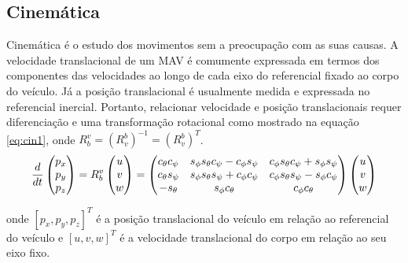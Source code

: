 \documentclass[a4paper, 12pt]{article}
\begin{document}
\subsection{Cinemática}

Cinemática é o estudo dos movimentos sem a preocupação com as suas causas. A velocidade translacional de um MAV é comumente expressada em termos dos componentes das velocidades ao longo de cada eixo do referencial fixado ao corpo do veículo. Já a posição translacional é usualmente medida e expressada no referencial inercial. Portanto, relacionar velocidade e posição translacionais requer diferenciação e uma transformação rotacional como mostrado na equação \ref{eq:cin1}, onde 
${ R }_{ b }^{ v } = {({ R }_{ v }^{ b })}^{-1} = {({ R }_{ v }^{ b })}^T$.
\begin{equation}
\centering
\frac { d }{ dt } 
\begin{pmatrix} 
	{ p }_{ x } \\ { p }_{ y } \\ { p }_{ z } 
\end{pmatrix} = 
{ R }_{ b }^{ v }
\begin{pmatrix} { u } \\ { v } \\ { w }\end{pmatrix} = 
\begin{pmatrix} { c }_{ \theta  }{ c }_{ \psi  } & { s }_{ \phi  }{ s }_{ \theta  }{ c }_{ \psi  }-{ c }_{ \phi  }{ s }_{ \psi  } & { c }_{ \phi  }{ s }_{ \theta  }{ c }_{ \psi  }+{ s }_{ \phi  }{ s }_{ \psi  } \\ { c }_{ \theta  }s_{ \psi  } & { s }_{ \phi  }{ s }_{ \theta  }{ s }_{ \psi  }+{ c }_{ \phi  }{ c }_{ \psi  } & { c }_{ \phi  }{ s }_{ \theta  }{ s }_{ \psi  }-{ s }_{ \phi  }{ c }_{ \psi  } \\ -{ s }_{ \theta  } & { s }_{ \phi  }{ c }_{ \theta  } & { c }_{ \phi  }{ c }_{ \theta  } \end{pmatrix}
\begin{pmatrix}
	{ u } \\ { v } \\ { w } 
\end{pmatrix}
\label{eq:cin1}
\end{equation}

\noindent onde $[p_x,p_y,p_z]^T$ é a posição translacional do veículo em relação ao referencial do veículo e $[u,v,w]^T$ é a velocidade translacional do corpo em relação ao seu eixo fixo.
\end{document}
